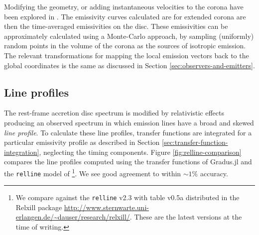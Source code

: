 \documentclass[fleqn,usenatbib]{mnras}
\newcommand{\Gradus}{Gradus.jl\xspace}
\newcommand{\relline}{\texttt{relline}\xspace}
\begin{document}
Modifying the geometry, or adding instantaneous velocities to the corona have
been explored in \cite{gonzalez_probing_2017}. The emissivity curves calculated
are for extended corona are then the time-averaged emissivities on the disc.
These emissivities can be approximately calculated using a Monte-Carlo approach,
by sampling (uniformly) random points in the volume of the corona as the sources
of isotropic emission. The relevant transformations for mapping the local
emission vectors back to the global coordinates is the same as discussed in
Section \ref{sec:observers-and-emitters}.

\subsection{Line profiles}

The rest-frame accretion disc spectrum is modified by relativistic effects producing an observed spectrum in which emission lines have a broad and skewed \emph{line profile}.
To calculate these line profiles, transfer functions are integrated for a particular emissivity profile as described in Section
\ref{sec:transfer-function-integration}, neglecting the timing components.
Figure \ref{fig:relline-comparison} compares the line profiles computed using
the transfer functions of \Gradus and the \relline model of
\cite{dauser_broad_2010}\footnote{We compare against the \relline v2.3 with
table v0.5a distributed in the Relxill package
\url{http://www.sternwarte.uni-erlangen.de/~dauser/research/relxill/}. These are
the latest versions at the time of writing.}. We see good agreement to within $\sim
1\%$ accuracy.
\end{document}
